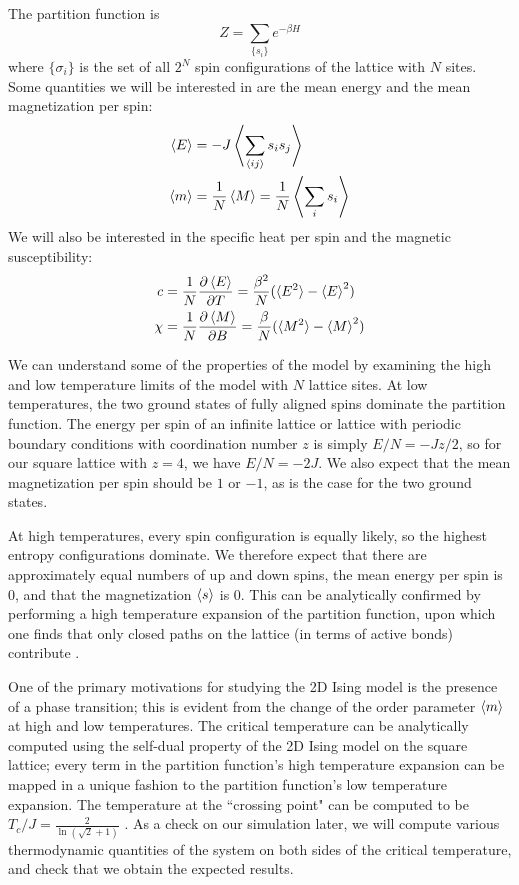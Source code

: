\documentclass[twocolumn,aps]{revtex4-1} %
\newcommand{\pd}{\partial}
\begin{document}
The partition function is
\begin{equation}
Z = \sum_{\{s_i\}}e^{-\beta H}
\end{equation}
where $\{\sigma_i\}$ is the set of all $2^N$ spin configurations of the lattice with $N$ sites. Some quantities we will be interested in are the mean energy and the mean magnetization per spin:
\begin{align}
\braket{E} &= -J \left\langle\sum_{\braket{ij}}s_is_j\right\rangle \\
\braket{m} &= \frac{1}{N}\braket{M} = \frac{1}{N}\left\langle\sum_is_i\right\rangle 
\end{align}
We will also be interested in the specific heat per spin and the magnetic susceptibility:
\begin{align}
c &= \frac{1}{N}\frac{\pd \braket{E}}{\pd T} = \frac{\beta^2}{N}(\braket{E^2} - \braket{E}^2) \\
\chi &= \frac{1}{N}\frac{\pd \braket{M}}{\pd B} = \frac{\beta}{N} (\braket{M^2} - \braket{M}^2)
\end{align}

We can understand some of the properties of the model by examining the high and low temperature limits of the model with $N$ lattice sites. At low temperatures, the two ground states of fully aligned spins dominate the partition function. The energy per spin of an infinite lattice or lattice with periodic boundary conditions with coordination number $z$ is simply $E/N = -Jz/2$, so for our square lattice with $z = 4$, we have $E/N = -2J$. We also expect that the mean magnetization per spin should be $1$ or $-1$, as is the case for the two ground states.

At high temperatures, every spin configuration is equally likely, so the highest entropy configurations dominate. We therefore expect that there are approximately equal numbers of up and down spins, the mean energy per spin is 0, and that the magnetization $\braket{s}$ is 0. This can be analytically confirmed by performing a high temperature expansion of the partition function, upon which one finds that only closed paths on the lattice (in terms of active bonds) contribute \cite{kardar}. 

One of the primary motivations for studying the 2D Ising model is the presence of a phase transition; this is evident from the change of the order parameter $\braket{m}$ at high and low temperatures. The critical temperature can be analytically computed using the self-dual property of the 2D Ising model on the square lattice; every term in the partition function's high temperature expansion can be mapped in a unique fashion to the partition function's low temperature expansion. The temperature at the ``crossing point" can be computed to be $T_c/J = \frac{2}{\ln(\sqrt{2}+1)}$ \cite{onsager, kardar}. As a check on our simulation later, we will compute various thermodynamic quantities of the system on both sides of the critical temperature, and check that we obtain the expected results.
\end{document}
